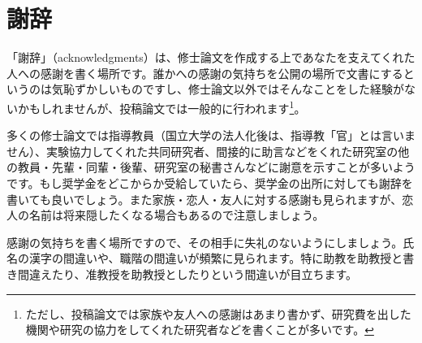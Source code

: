 \chapter*{謝辞}%

「謝辞」（acknowledgments）は、修士論文を作成する上であなたを支えてくれた人への感謝を書く場所です。誰かへの感謝の気持ちを公開の場所で文書にするというのは気恥ずかしいものですし、修士論文以外ではそんなことをした経験がないかもしれませんが、投稿論文では一般的に行われます\footnote{ただし、投稿論文では家族や友人への感謝はあまり書かず、研究費を出した機関や研究の協力をしてくれた研究者などを書くことが多いです。}。

多くの修士論文では指導教員（国立大学の法人化後は、指導教「官」とは言いません）、実験協力してくれた共同研究者、間接的に助言などをくれた研究室の他の教員・先輩・同輩・後輩、研究室の秘書さんなどに謝意を示すことが多いようです。もし奨学金をどこからか受給していたら、奨学金の出所に対しても謝辞を書いても良いでしょう。また家族・恋人・友人に対する感謝も見られますが、恋人の名前は将来隠したくなる場合もあるので注意しましょう。

感謝の気持ちを書く場所ですので、その相手に失礼のないようにしましょう。氏名の漢字の間違いや、職階の間違いが頻繁に見られます。特に助教を助教授と書き間違えたり、准教授を助教授としたりという間違いが目立ちます。

